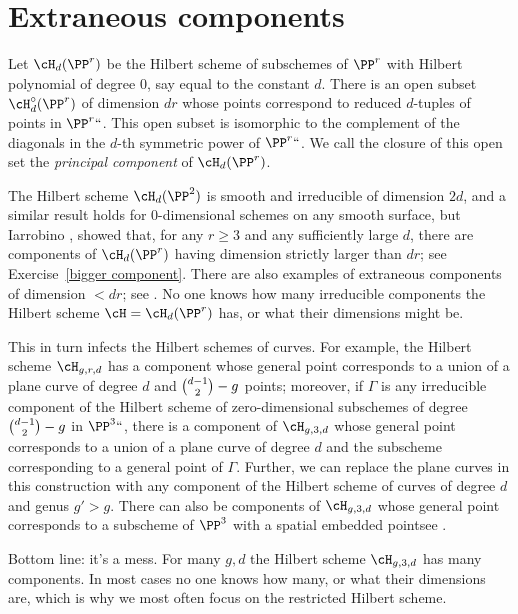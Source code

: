 \section{Extraneous components}

Let $\cH_d(\PP^r)$ be the Hilbert scheme of subschemes of $\PP^r$
with Hilbert polynomial of degree 0, say equal to the constant $d$.
There is an open subset $\cH^\circ_d(\PP^r)$ of dimension $dr$ whose
points correspond to reduced $d$-tuples of points in $\PP^r` `$. This
open subset is isomorphic to the complement of the diagonals in the
$d$-th symmetric power of $\PP^r` `$. We call the closure of this open
set the \emph{principal component} of $\cH_d(\PP^r)$.
%

The Hilbert scheme  $\cH_d(\PP^2)$ is smooth and irreducible of dimension
$2d$, and a similar result holds for
0-dimensional schemes on any smooth surface, but Iarrobino
\citeyear{Iarrobino1985}
,
showed
that, for any $r \geq 3$ and any sufficiently large $d$, there are
components of $\cH_d(\PP^r)$ having dimension strictly larger than $dr$;
see Exercise~\ref{bigger component}. There are
also examples of extraneous components
%
of dimension $<dr$; see \cite{MR2579394}. No one knows how many
irreducible components the Hilbert scheme $\cH = \cH_d(\PP^r)$ has,
or what their dimensions might be.

This in turn infects the Hilbert schemes of curves. For example,
the Hilbert scheme $\cH_{g,r,d}$ has a component whose general point
corresponds to a union of a plane curve of degree $d$ and $\tbinom{d-1}{2}
- g$ points; moreover, if $\Gamma$ is any irreducible component of the
Hilbert scheme of zero-dimensional subschemes of degree $\tbinom{d-1}{2} -
g$ in $\PP^3` `$, there is a component of $\cH_{g,3,d}$ whose  general point
corresponds to a union of a plane curve of degree $d$ and the subscheme
corresponding to a general point of $\Gamma$. Further, we can replace the
plane curves in this construction with any component of the Hilbert scheme
of curves of degree $d$ and genus $g' > g$. There can also be components
of $\cH_{g,3,d}$ whose general point corresponds to a subscheme of $\PP^3$
with a spatial embedded point\emdash see \cite{Chen-Nollet}.

Bottom line: it's a mess. For many $g,d$ the Hilbert scheme $\cH_{g,3,d}$
has many components. In most cases no one knows how many, or what their
dimensions are, which is why we most often focus on the restricted
Hilbert scheme.


